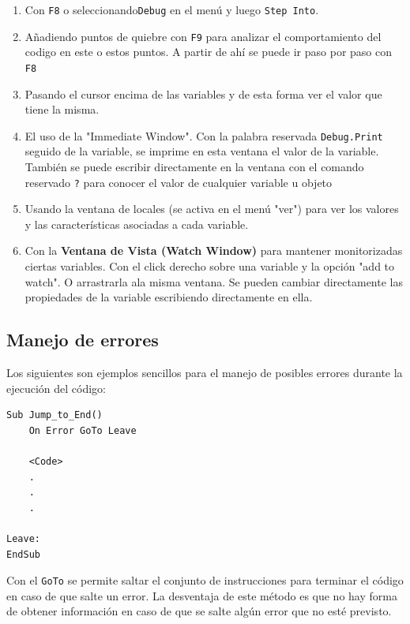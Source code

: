 \begin{enumerate}
    \item Con \texttt{F8} o seleccionando\texttt{Debug} en el menú y luego \texttt{Step Into}.
    \item Añadiendo puntos de quiebre con \texttt{F9} para analizar el comportamiento del codigo en este o estos puntos. A partir de ahí se puede ir paso por paso con \texttt{F8}
    \item Pasando el cursor encima de las variables y de esta forma ver el valor que tiene la misma.
    \item El uso de la "Immediate Window". Con la palabra reservada \texttt{Debug.Print} seguido de la variable, se imprime en esta ventana el valor de la variable. También se puede escribir directamente en la ventana con el comando reservado \texttt{?} para conocer el valor de cualquier variable u objeto
    \item Usando la ventana de locales (se activa en el menú "ver") para ver los valores y las características asociadas a cada variable.
    \item Con la \textbf{Ventana de Vista (Watch Window)} para mantener monitorizadas ciertas variables. Con el click derecho sobre una variable y la opción "add to watch". O arrastrarla ala misma ventana. Se pueden cambiar directamente las propiedades de la variable escribiendo directamente en ella. 
\end{enumerate}


\subsection{Manejo de errores}

Los siguientes son ejemplos sencillos para el manejo de posibles errores durante la ejecución del código:

\begin{verbatim}
Sub Jump_to_End()
    On Error GoTo Leave
    
    <Code>
    .
    .
    .
    
Leave:
EndSub
\end{verbatim}



Con el \texttt{GoTo} se permite saltar el conjunto de instrucciones para terminar el código en caso de que salte un error. La desventaja de este método es que no hay forma de obtener información en caso de que se salte algún error que no esté previsto.



